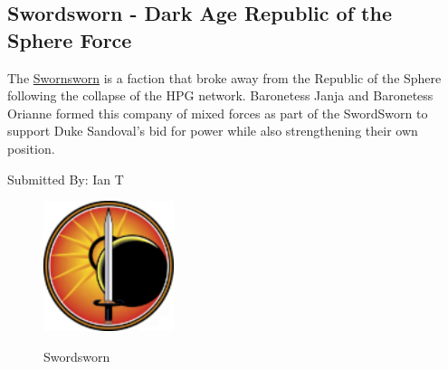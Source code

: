 \subsection{Swordsworn - Dark Age Republic of the Sphere Force}

The \href{https://www.sarna.net/wiki/Swordsworn}{Swornsworn} is a faction that broke away from the Republic of the Sphere following the collapse of the HPG network.
Baronetess Janja and Baronetess Orianne formed this company of mixed forces as part of the SwordSworn to support Duke Sandoval's bid for power while also strengthening their own position.

Submitted By: Ian T

\begin{figure}[!h]
  \centering
  \includegraphics[alt='Swordsworn Logo', width=1.5in, height=1.5in]{img/Swordsworn.png}
  \caption*{Swordsworn}
\end{figure}

